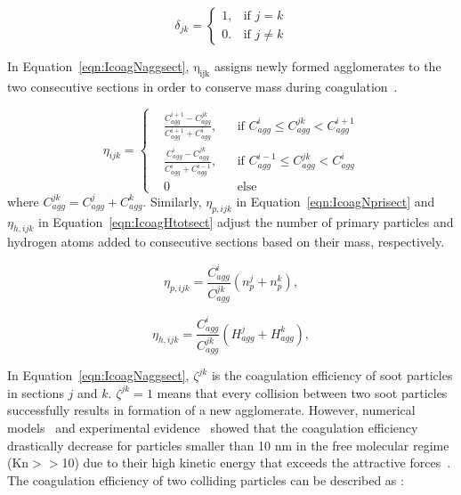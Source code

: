 \begin{equation}
	\delta_{jk}=
	\left\{
	\begin{array}{lr}
		1, & \text{if } j = k\\
		0. & \text{if } j \neq k
	\end{array}
	\right.
	\label{eqn:deltakronecker}
\end{equation}

In Equation~\eqref{eqn:IcoagNaggsect}, $\mathrm{\eta_{ijk}}$ assigns newly formed agglomerates to the two consecutive sections in order to conserve mass during coagulation~\citep{park2005aerosol}.

\begin{equation}
	\eta_{ijk}=
	\left\{
	\begin{aligned}
		&\frac{C^{i+1}_{agg}-C^{jk}_{agg}}{C^{i+1}_{agg}+C^i_{agg}},
		&&
		\text{if } C^i_{agg} \le C^{jk}_{agg} < C^{i+1}_{agg}
		\\
		&\frac{C^{i}_{agg}-C^{jk}_{agg}}{C^{i}_{agg}+C^{i-1}_{agg}}, 
		&&
		\text{if } C^{i-1}_{agg} \le C^{jk}_{agg} < C^{i}_{agg}
		\\
		&0
		&&\text{else}
	\end{aligned}
	\right.
	\label{eqn:etacoag}
\end{equation}
\noindent where ${C^{jk}_{agg}=C^{j}_{agg}+C^{k}_{agg}}$. Similarly, $\eta_{p,ijk}$ in Equation~\eqref{eqn:IcoagNprisect} and $\eta_{h,ijk}$ in Equation~\eqref{eqn:IcoagHtotsect} adjust the number of primary particles and hydrogen atoms added to consecutive sections based on their mass, respectively.

\begin{equation}
	\eta_{p,ijk}=
	\frac{C^i_{agg}}{C^{jk}_{agg}}
	\left(
	n^j_p + n^k_p
	\right)
	\label{eqn:etapcoag},
\end{equation}

\begin{equation}
	\eta_{h,ijk}=
	\frac{C^i_{agg}}{C^{jk}_{agg}}
	\left(
	H^j_{agg} + H^k_{agg}
	\right)
	\label{eqn:etahcoag},
\end{equation}


In Equation~\eqref{eqn:IcoagNaggsect}, $\zeta^{jk}$ is the coagulation efficiency of soot particles in sections $j$ and $k$. $\zeta^{jk}=1$ means that every collision between two soot particles successfully results in formation of a new agglomerate. However, numerical models~\citep{narsimhan1985brownian} and experimental evidence~\citep{d2005surface} showed that the coagulation efficiency drastically decrease for particles smaller than 10 nm in the free molecular regime (Kn$>>$10) due to their high kinetic energy that exceeds the attractive forces~\citep{wang1991filtration}. The coagulation efficiency of two colliding particles can be described as \cite{narsimhan1985brownian}:

